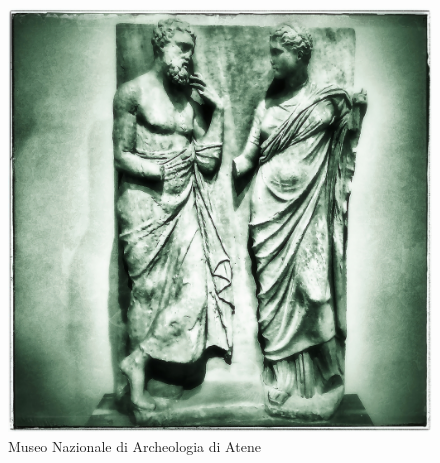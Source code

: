 \documentclass[nols]{tufte-handout}
\begin{document}
\begin{figure}[!b]
  \includegraphics{thumb-lesson_II.jpeg}
  \caption{Museo Nazionale di Archeologia di Atene}
  \label{fig:textfig}
\end{figure}


\end{document}
